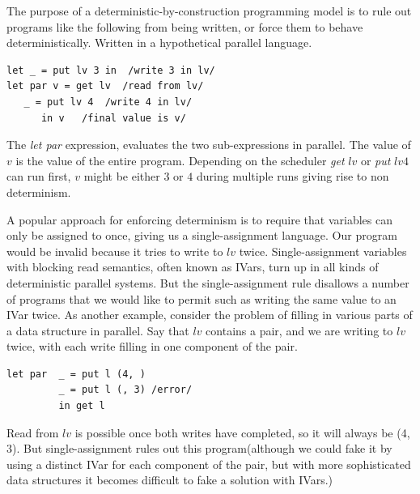 \documentclass[twocolumn]{article}
\begin{document}
The purpose of a deterministic-by-construction programming model is to rule out programs like the following from being written, or force them to behave deterministically. \cite{lindsey}Written in a hypothetical parallel language. 
\begin{lstlisting}
let _ = put lv 3 in  /write 3 in lv/
let par v = get lv  /read from lv/
   _ = put lv 4  /write 4 in lv/
	  in v   /final value is v/
\end{lstlisting}
The \textit{let par} expression, evaluates the two sub-expressions in parallel. The value of $v$ is the value of the entire program. Depending on the scheduler \textit{get} $lv$ or \textit{put} $lv 4$ can run first, $v$ might be either $3$ or $4$ during multiple runs giving rise to non determinism.\par
A popular approach for enforcing determinism is to require that variables can only be assigned to once, giving us a single-assignment language. Our program would be invalid because it tries to write to $lv$ twice. Single-assignment variables with blocking read semantics, often known as IVars, turn up in all kinds of deterministic parallel systems. But the single-assignment rule disallows a number of programs that we would like to permit such as writing the same value to an IVar twice. As another example, consider the problem of filling in various parts of a data structure in parallel. \cite{lindsey}Say that $lv$ contains a pair, and we are writing to $lv$ twice, with each write filling in one component of the pair. \par 
\begin{lstlisting}
let par  _ = put l (4, )
         _ = put l (, 3) /error/
         in get l
\end{lstlisting}  
Read from $lv$ is possible once both writes have completed, so it will always be (4, 3). But single-assignment rules out this program(although we could fake it by using a distinct IVar for each component of the pair, but with more sophisticated data structures it becomes difficult to fake a solution with IVars.)\par
\end{document}
